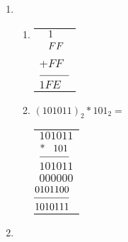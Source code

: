 \documentclass[8pt,a4paper]{article}
\begin{document}
\begin{enumerate}[itemsep=20pt]
\item
	\begin{enumerate}
		\item
			\begin{tabular}[t]{l}
				\(\hspace{3 mm}1\)\\
				\(\hspace{3 mm}FF\)\\
				+\(FF\)\\
				\(\line(1,0){30}\)\\
				\(1FE\)\\
			\end{tabular}
		\item
			$(101011)_2 * 101_2 = $
			\begin{tabular}[t]{l}
				\(101011\)\\
				\($*$\hspace{3 mm}101\)\\
				\(\line(1,0){30}\)\\
				\(101011\)\\
				\(000000\)\\
				\(\hspace{-3.5mm}10101100\)\\
				\(\hspace{-3.5mm}\line(1,0){40}\)\\
				\(\hspace{-3.5mm}11010111\)\\
			\end{tabular}
	\end{enumerate}
\item


\end{enumerate}
\end{document}
